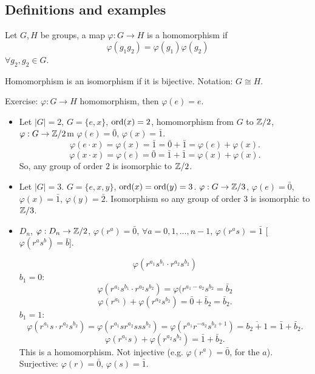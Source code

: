 \documentclass[10pt, a4paper]{article}
\begin{document}
\subsection{Definitions and examples}

\begin{definition}
    Let $G, H$ be groups,
    a map $\varphi : G \to H$ is a homomorphism if
    \[
    \varphi(g_1g_2) = \varphi(g_1)\varphi(g_2)
    \]
    $\forall g_2, g_2 \in G$.

    Homomorphism is an isomorphism if it is bijective.
    Notation:
    $G \cong H$.
\end{definition}

Exercise:
$\varphi : G \to H$ homomorphism,
then $\varphi(e) = e$.

\begin{example}
    \begin{itemize}
        \item Let $|G| = 2$,
        $G = \{e, x\}$,
        $\operatorname{ord}(x) = 2$,
        homomorphism from $G$ to $\mathbb{Z} / 2$,
        $\varphi : G \to \mathbb{Z} / 2$m
        $\varphi(e) = \bar{0}$,
        $\varphi(x) = \bar{1}$.
        \[
        \varphi(e \cdot x) = \varphi(x) = \bar{1} = \bar{0} + \bar{1} = \varphi(e) + \varphi(x).
        \]
        \[
        \varphi(x \cdot x) = \varphi(e) = \bar{0} = \bar{1} + \bar{1} = \varphi(x) + \varphi(x).
        \]
        So,
        any group of order $2$ is isomorphic to $\mathbb{Z} / 2$.

        \item Let $|G| = 3$.
        $G = \{e, x, y\}$,
        $\operatorname{ord}(x) = \operatorname{ord}(y) = 3$.
        $\varphi : G \to \mathbb{Z} / 3$,
        $\varphi(e) = \bar{0}$,
        $\varphi(x) = \bar{1}$,
        $\varphi(y) = \bar{2}$.
        Isomorphism so any group of order $3$ is isomorphic to $\mathbb{Z} / 3$.

        \item $D_n$,
        $\varphi : D_n \to \mathbb{Z} / 2$,
        $\varphi(r ^ a) = \bar{0}$,
        $\forall a = 0, 1, \dotsc, n - 1$,
        $\varphi(r ^ as) = \bar{1}$
        [$\varphi(r ^ as ^ b) = \bar{b}$].

        \[
        \varphi(r ^ {a_1}s ^ {b_1}\cdot r ^ {a_2}s ^ {b_2})
        \]
        $b_1 = 0$:
        \[
        \varphi(r ^ {a_1}s ^ {b_1}\cdot r ^ {a_2}s ^ {b_2}) = \varphi(r ^ {a_1 - a_2}s ^ {b_2} = \bar{b}_2
        \]
        \[
        \varphi(r ^ {a_1}) + \varphi(r ^ {a_2}s ^ {b_2}) = \bar{0} + \bar{b}_2 = \bar{b}_2.
        \]
        $b_1 = 1$:
        \[
        \varphi(r ^ {a_1}s\cdot r ^ {a_2}s ^ {b_2}) = \varphi(r ^ {a_1}sr ^ {a_2}sss ^ {b_2}) = \varphi(r ^ {a_1}r ^ {-a_2}s ^ {b_2 + 1}) = \overline{b_2 + 1} = \bar{1} + \bar{b}_2.
        \]
        \[
        \varphi(r ^ {a_1}s) + \varphi(r ^ {a_2}s ^ {b_2}) = \bar{1} + \bar{b}_2.
        \]
        This is a homomorphism.
        Not injective
        (e.g. $\varphi(r ^ a) = \bar{0}$,
        for the $a$).
        Surjective:
        $\varphi(r) = \bar{0}$,
        $\varphi(s) = \bar{1}$.


\end{itemize}
\end{example}
\end{document}
